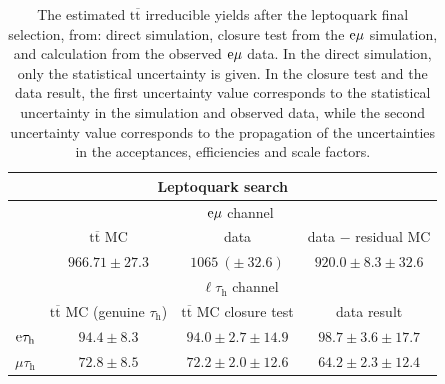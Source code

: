 \documentclass[12pt]{thesis}  %
\newcommand{\tauh}{\ensuremath{\tau_{\text{h}}}\xspace}
\newcommand{\Pe}{\ensuremath{\cmsSymbolFace{e}}\xspace}
\newcommand{\mutau}{\ensuremath{\mu\tauh}\xspace}
\newcommand{\etau}{\ensuremath{\Pe\tauh}\xspace}
\newcommand{\emu}{\ensuremath{\Pe\mu}\xspace}
\newcommand{\ltau}{\ensuremath{\ell\tauh}\xspace}
\renewcommand{\ttbar}{\ensuremath{\mathrm{t}\overline{\mathrm{t}}}\xspace}
\begin{document}
\begin{table}[hbt]
  \begin{center}
    \begin{tabular}{|l|c|c|c|}
	  \multicolumn{4}{c}{Leptoquark search} \\
      \hline
      \multirow{3}{*}{} & \multicolumn{3}{c|}{$\emu$ channel} \\
      \cline{2-4}
      & \ttbar MC & data & data $-$ residual MC \\
      \cline{2-4}
      & $966.71 \pm 27.3$ & $1065~(\pm~32.6)$ & $920.0 \pm 8.3 \pm 32.6$  \\
      \hline\hline
      \multirow{2}{*}{} & \multicolumn{3}{c|}{$\ltau$ channel} \\
      \hline
      channel & \ttbar MC (genuine \tauh) & \ttbar MC closure test & data result \\
      \hline
      $\etau$         & $94.4\pm8.3$ & $94.0\pm2.7\pm14.9$ & $98.7\pm3.6\pm17.7$ \\ %
      $\mutau$       & $72.8\pm8.5$ & $72.2\pm2.0\pm12.6$ & $64.2\pm2.3\pm12.4$ \\ %
      \hline
    \end{tabular}
    \caption{The estimated \ttbar irreducible yields after the leptoquark final selection, from: direct simulation, closure test from the $\emu$ simulation, and calculation from the observed $\emu$ data. In the direct simulation, only the statistical uncertainty is given. In the closure test and the data result, the first uncertainty value corresponds to the statistical uncertainty in the simulation and observed data, while the second uncertainty value corresponds to the propagation of the uncertainties in the acceptances, efficiencies and scale factors. }
    \label{tab:ttYieldsLQ}
  \end{center}
\end{table}
\end{document}
